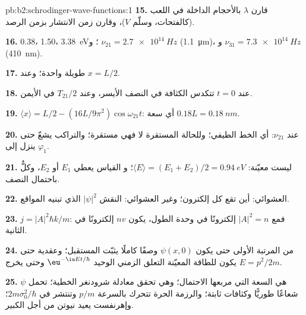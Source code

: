 \begin{solution}{pb:b2:schrodinger-wave-functions:1}
\textbf{15.} قارن $\lambda$ بالأحجام الداخلة في اللعب (كالفتحات، وسلّم
$V$)، وقارن زمن الانتشار بزمن الرصد.

\textbf{16.} \qty{0.38}{}، \qty{1.50}{}، \qty{3.38}{eV}؛ و $\nu_{21} = \qty{2.7e14}{Hz}$
(\qty{1.1}{\micro m})، و $\nu_{31} = \qty{7.3e14}{Hz}$ (\qty{410}{nm}).

\textbf{17.}  طويلة واحدة؛ وعند $x = L/2$.

\textbf{18.} عند $t = 0$ تتكدس الكثافة في النصف الأيسر، وعند
$T_{21}/2$ في الأيمن.

\textbf{19.} $\langle x\rangle = L/2 - (16L/9\pi^2)\cos\omega_{21}t$: أي سعة
$0.18L = \qty{0.18}{nm}$.

\textbf{20.} عند $\nu_{21}$: أي الخط الطيفي؛ وللحالة المستقرة لا  فهي مستقرة؛ والتراكب يشعّ حتى ينزل
إلى $\varphi_1$.

\textbf{21.} ليست معيّنة: $\langle E\rangle = (E_1 + E_2)/2 = \qty{0.94}{eV}$؛ و
القياس يعطي $E_1$ أو $E_2$، وكلٌّ باحتمال النصف.

\textbf{22.} العشوائي: أين تقع كل إلكترون؛ وغير العشوائي:
النقش $|\psi|^2$ الذي تبنيه المواقع.

\textbf{23.} $j = |A|^2\hbar k/m$: فمع $|A|^2 = n$ إلكترونًا في وحدة الطول،
يكون $nv$ إلكترونًا في الثانية.

\textbf{24.} من المرتبة الأولى حتى يكون $\psi(x,0)$ وصفًا كاملًا
يثبّت المستقبل؛ وعقدية حتى يكون للطاقة المعيّنة التعلق
الزمني الوحيد $\eu^{-\iu Et/\hbar}$ وحتى يخرج $E = p^2/2m$.

\textbf{25.} $\psi$ هي السعة التي مربعها الاحتمال؛ وهي
تحقق معادلة شرودنغر الخطية؛  تحمل
شعاعًا طوريًّا وكثافات ثابتة؛ والرزمة الحرة تتحرك بالسرعة $p/m$ وتنتشر
في $2m\sigma_0^2/\hbar$؛ وإهرنفست يعيد نيوتن من أجل الكبير.
\end{solution}
